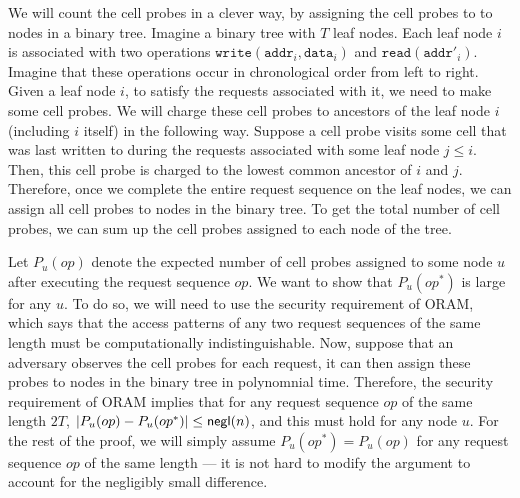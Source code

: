 We will count the cell probes in a clever way, by assigning
the cell probes to 
to nodes in a binary tree. 
Imagine a binary tree with $T$ leaf nodes.
Each leaf node $i$ is associated with two operations
$\texttt{write}(\texttt{addr}_i, \texttt{data}_i)$
and $\texttt{read}(\texttt{addr}'_i)$.
Imagine that these operations 
occur in chronological order from left to right. 
Given a leaf node $i$, 
to satisfy the requests associated with it,
we need to make some cell probes.
We will charge these cell probes 
to ancestors of the leaf node $i$ (including $i$ itself) in the following way. 
Suppose a cell probe  
visits some cell that was last  
written to during the 
requests associated with some leaf node $j \leq i$.
Then, this cell probe is charged to the 
lowest common 
ancestor of $i$ and $j$.
Therefore, once we complete the entire request sequence
on the leaf nodes, we can assign all cell probes
to nodes in the binary tree.
To get the total number of cell probes, we can sum
up the cell probes assigned to each node of the tree.


Let $P_u(op)$ denote the expected number 
of cell probes assigned to 
some node $u$ after executing the request sequence $op$.
We want to show that $P_u(op^*)$ is large for any $u$.
To do so, we will need to use the security requirement of ORAM,
 which says that the access patterns
of any two request sequences of the same length
must be computationally indistinguishable.
Now, suppose that an adversary 
observes the cell probes
for each request, it  
can then assign these probes to nodes in the binary tree 
in polynomnial time.
Therefore, 
the security requirement of ORAM implies
that for any 
request sequence $op$ of the same length $2T$,
$|P_{u}(op) - 
P_{u}(op^*)| \leq {\sf negl}(n)$,
and this must hold for any node $u$.
For the rest of the proof, we will simply assume
$P_{u}(op^*) = P_u(op)$
for any request sequence $op$
of the same length --- it is not hard to modify the argument to account
for the negligibly small difference. 


